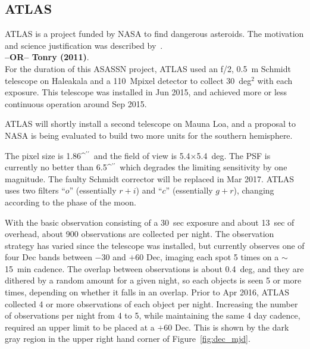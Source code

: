 \documentclass[aps,prb,twocolumn,superscriptaddress]{revtex4-1}
\def\arcsec{\ifmmode^{\prime\prime}\else$^{\prime\prime}$\fi}
\begin{document}
\subsection{ATLAS}
%
ATLAS is a project funded by NASA to find dangerous asteroids.  The
motivation and science justification was described by~\cite{ATLAS_data}.  \\
{\bf --OR--  Tonry (2011)}.  \\
For the duration of this ASASSN project, ATLAS used an f/2, 0.5~m
Schmidt telescope on Haleakala and a 110~Mpixel detector to collect
30~deg$^2$ with each exposure.  This telescope was installed in Jun
2015, and achieved more or less continuous operation around Sep 2015.

ATLAS will shortly install a second telescope on Mauna Loa, and a
proposal to NASA is being evaluated to build two more units for the
southern hemisphere.

The pixel size is 1.86\arcsec\ and the field of view is
5.4$\times$5.4~deg.  The PSF is currently no better than 6.5\arcsec\
which degrades the limiting sensitivity by one magnitude.  The faulty
Schmidt corrector will be replaced in Mar 2017.  ATLAS uses two
filters ``$o$'' (essentially $r+i$) and ``$c$'' (essentially $g+r$),
changing according to the phase of the moon.

With the basic observation consisting of a 30~sec exposure and about 
13~sec of overhead, about 900 observations are collected per night.  
The observation strategy has varied since the telescope was
installed, but currently observes one of four Dec bands between $-30$ %
and $+60$ Dec, imaging each spot 5 times on a $\sim$15~min cadence.
The overlap between observations is about 0.4~deg, and they are
dithered by a random amount for a given night, so each objects is seen
5 or more times, depending on whether it falls in an overlap.  
Prior to Apr 2016, ATLAS collected 4 or more observations of each object 
per night. Increasing the number of observations per night from 4 to 5, 
while maintaining the same 4 day cadence, required an upper limit to 
be placed at a $+60$ Dec. This is shown by the dark gray region in 
the upper right hand corner of Figure~\ref{fig:dec_mjd}.
\end{document}
